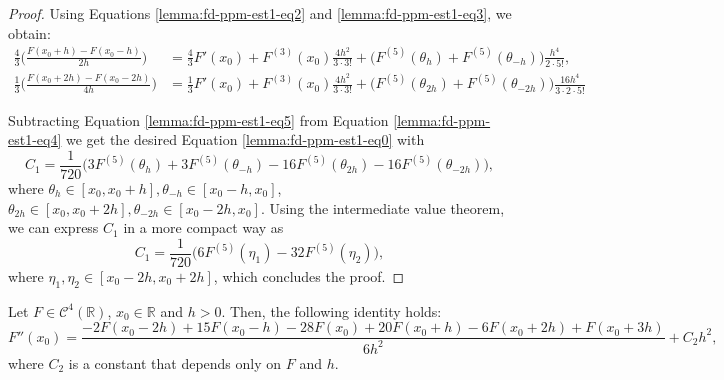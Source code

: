\begin{proof}
	Using Equations \eqref{lemma:fd-ppm-est1-eq2} and \eqref{lemma:fd-ppm-est1-eq3}, we obtain:
	\begin{align}
		\label{lemma:fd-ppm-est1-eq4}
		\frac{4}{3} \bigg(\frac{F(x_0+h) - F(x_0-h)}{2h}\bigg) &= \frac{4}{3} F'(x_0) +
				F^{(3)}(x_0)\frac{4h^2}{3\cdot3!} +
                \bigg( F^{(5)}(\theta_{h}) + F^{(5)}(\theta_{-h})\bigg)\frac{h^4}{2\cdot5!},\\
        \label{lemma:fd-ppm-est1-eq5}
	        	\frac{1}{3} \bigg(\frac{F(x_0+2h) - F(x_0-2h)}{4h}\bigg) &= \frac{1}{3} F'(x_0)+
		       	F^{(3)}(x_0)\frac{4h^2}{3\cdot3!} +
		        \bigg( F^{(5)}(\theta_{2h}) + F^{(5)}(\theta_{-2h})\bigg) \frac{16h^4}{3\cdot2\cdot5!} 
	\end{align}

	Subtracting Equation \eqref{lemma:fd-ppm-est1-eq5} from Equation \eqref{lemma:fd-ppm-est1-eq4} we get 
	the desired Equation \eqref{lemma:fd-ppm-est1-eq0} with
	\begin{equation}
		C_1 = \frac{1}{720}\bigg( 3F^{(5)}(\theta_{h}) + 3F^{(5)}(\theta_{-h})
            -16F^{(5)}(\theta_{2h}) - 16F^{(5)}(\theta_{-2h})\bigg), 
	\end{equation}
	where $\theta_{h} \in [x_0,x_0+h], \theta_{-h}\in [x_0-h,x_0]$, 
	$\theta_{2h} \in [x_0,x_0+2h], \theta_{-2h}\in [x_0-2h,x_0]$.
	Using the intermediate value theorem, we can express $C_1$ in a more compact way as
	\begin{equation}
	\label{lemma:fd-ppm-est1-eq6}
	C_1 = \frac{1}{720}\bigg( 6F^{(5)}(\eta_{1}) -32F^{(5)}(\eta_{2})\bigg), 
\end{equation}
where $\eta_{1}, \eta_{2} \in [x_0-2h,x_0+2h]$, which concludes the proof.
\end{proof}


\begin{lema}
	\label{lemma:fd-ppm-est2}
	Let $F \in \mathcal{C}^{4}(\mathbb{R})$, $x_0 \in \mathbb{R}$ and $h>0$.
	Then, the following identity holds:
	\begin{equation}	
		\label{lemma:fd-ppm-est2-eq0}
		F''(x_0) =  \frac{-2F(x_0-2h) + 15F(x_0-h) -28F(x_0) + 20F(x_0+h) -6F(x_0+2h) + F(x_0+3h)}{6h^2}
		      + C_2h^2,
	\end{equation}
	where $C_2$ is a constant that depends only on $F$ and $h$.
\end{lema}

